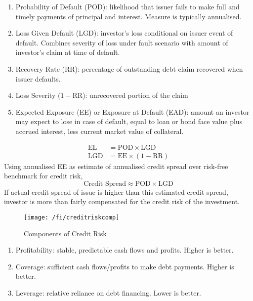 \begin{remark} 
\begin{enumerate}[label=\roman*.]
\setlength{\itemsep}{0pt}
\item Probability of Default (POD): likelihood that issuer fails to make full and timely payments of principal and interest. Measure is typically annualised.
\item Loss Given Default (LGD): investor's loss conditional on issuer event of default. Combines severity of loss under fault scenario with amount of investor's claim at time of default.
\item Recovery Rate (RR): percentage of outstanding debt claim recovered when issuer defaults.
\item Loss Severity ($1 - \text{RR}$): unrecovered portion of the claim
\item Expected Exposure (EE) or Exposure at Default (EAD): amount an investor may expect to lose in case of default, equal to loan or bond face value plus accrued interest, less current market value of collateral.
\end{enumerate}
\begin{align}
\text{EL} &= \text{POD} \times \text{LGD} \nonumber \\
\text{LGD} &= \text{EE} \times (1 - \text{RR}) \nonumber
\end{align}
Using annualised EE as estimate of annualised credit spread over risk-free benchmark for credit risk,
\begin{equation}
\text{Credit Spread} \approx \text{POD} \times \text{LGD} \nonumber
\end{equation}
If actual credit spread of issue is higher than this estimated credit spread, investor is more than fairly compensated for the credit risk of the investment. 
\end{remark}

\begin{figure}[H]
\centering
\texttt{[image: /fi/creditriskcomp]}
\caption{Components of Credit Risk}
\end{figure}

\begin{remark} 
\begin{enumerate}[label=\roman*.]
\setlength{\itemsep}{0pt}
\item Profitability: stable, predictable cash flows and profits. Higher is better.
\item Coverage: sufficient cash flows/profits to make debt payments. Higher is better.
\item Leverage: relative reliance on debt financing. Lower is better.
\end{enumerate}
\end{remark}


